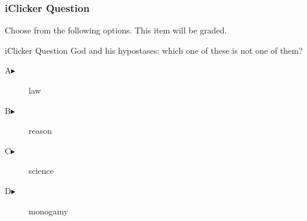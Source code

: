 \begin{frame}
  \frametitle{iClicker Question}
Choose from the following options. This item will be graded.
\begin{block}{iClicker Question}
God and his hypostases: which one of these is not one of them?
\end{block}
\begin{description}
\item[A\hspace{.2in}$\blacktriangleright$] law
\item[B\hspace{.2in}$\blacktriangleright$] reason
\item[C\hspace{.2in}$\blacktriangleright$] science
\item[D\hspace{.2in}$\blacktriangleright$] monogamy
\end{description}
\end{frame}
